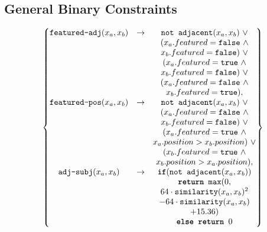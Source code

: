 \subsection*{General Binary Constraints}
\hspace{-40pt}
\begin{minipage}{.9\largefigure}
\vspace{-30pt}
\begin{align}
	\begin{Bmatrix}
		\texttt{featured-adj}(x_a, x_b) &\rightarrow& \texttt{not adjacent}(x_a,x_b)\ \vee\\
			&&(x_a.featured = \texttt{false}\ \wedge\\
			&&x_b.featured = \texttt{false})\ \vee\\
			&&(x_a.featured = \texttt{true}\ \wedge\\
			&&x_b.featured = \texttt{false})\ \vee\\
			&&(x_a.featured = \texttt{false}\ \wedge\\
			&&x_b.featured = \texttt{true}),\\
		\texttt{featured-pos}(x_a, x_b) &\rightarrow& \texttt{not adjacent}(x_a,x_b)\ \vee\\
			&&(x_a.featured = \texttt{false}\ \wedge\\
			&&x_b.featured = \texttt{false})\ \vee\\
			&&(x_a.featured = \texttt{true}\ \wedge\\
			&&x_a.position > x_b.position)\ \vee\\
			&&(x_b.featured = \texttt{true}\ \wedge\\
			&&x_b.position > x_a.position),\\
		\texttt{adj-subj}(x_a, x_b) &\rightarrow& \texttt{\textbf{if}}(\texttt{not adjacent}(x_a,x_b))\\
			&&\texttt{\textbf{return} max}(0,\\
			&&64 \cdot \texttt{similarity}(x_a,x_b)^2\\
			&& - 64 \cdot \texttt{similarity}(x_a,x_b)\\
			&& + 15.36)\\
			&&\texttt{\textbf{else return }}0
	\end{Bmatrix}
\end{align}
\end{minipage}

